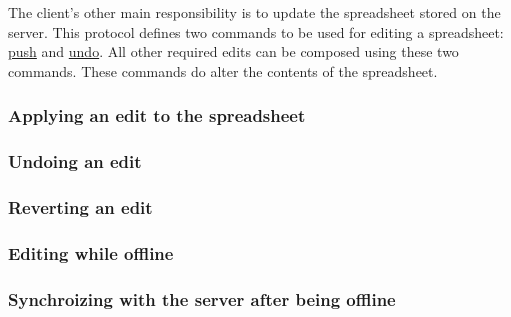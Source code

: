 The client’s other main responsibility is to update the spreadsheet stored 
on the server. This protocol defines two commands to be used for editing a 
spreadsheet: \hyperref[sec:message:push]{push} and \hyperref[sec:message:undo]{undo}. 
All other required edits can be composed using these two commands. These 
commands do alter the contents of the spreadsheet.

\subsubsection{Applying an edit to the spreadsheet}


\subsubsection{Undoing an edit}


\subsubsection{Reverting an edit}


\subsubsection{Editing while offline}


\subsubsection{Synchroizing with the server after being offline}

